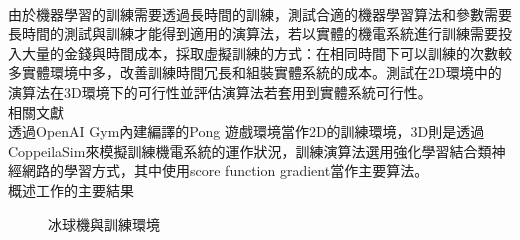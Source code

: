 \begin{flushleft}
\fontsize{12pt}{12pt} \\
\end{flushleft}

由於機器學習的訓練需要透過長時間的訓練，測試合適的機器學習算法和參數需要長時間的測試與訓練才能得到適用的演算法，若以實體的機電系統進行訓練需要投入大量的金錢與時間成本，採取虛擬訓練的方式：在相同時間下可以訓練的次數較多實體環境中多，改善訓練時間冗長和組裝實體系統的成本。測試在2D環境中的演算法在3D環境下的可行性並評估演算法若套用到實體系統可行性。\\

相關文獻\\

透過OpenAI Gym內建編譯的Pong 遊戲環境當作2D的訓練環境，3D則是透過CoppeilaSim來模擬訓練機電系統的運作狀況，訓練演算法選用強化學習結合類神經網路的學習方式，其中使用score function gradient當作主要算法。\\

概述工作的主要結果\\

\begin{figure}
\centering

\quad
{}\quad
{}
\caption{冰球機與訓練環境}\label{fig.pong_gym}
\end{figure}


\newpage